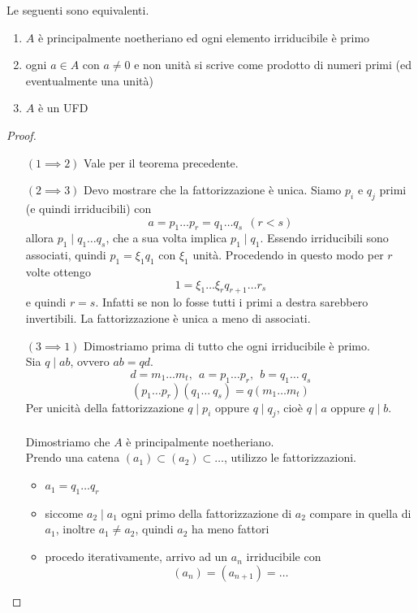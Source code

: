 	\label{lezione4}
\begin{teorema}
	Le seguenti sono equivalenti.
	\begin{enumerate}
		\item $A$ è principalmente noetheriano ed ogni elemento irriducibile è primo
		\item ogni $a \in A$ con $a\neq0$ e non unità si scrive come prodotto di numeri primi (ed eventualmente una unità)
		\item $A$ è un UFD
	\end{enumerate}
\end{teorema}
\begin{proof}\
	\begin{itemize}
		\item[$(1 \implies 2)$] Vale per il teorema precedente.
		\item[$(2 \implies 3)$] Devo mostrare che la fattorizzazione è unica. Siamo $p_i$ e $q_j$ primi (e quindi irriducibili) con
			\begin{equation*}
			a=p_1 \dots p_r = q_1 \dots q_s \ \ (r<s)
			\end{equation*}
			allora $p_1\mid q_1 \dots q_s$, che a sua volta implica $p_1\mid q_1$. Essendo irriducibili sono associati, quindi $p_1=\xi_1 q_1$ con $\xi_1$ unità. Procedendo in questo modo per $r$ volte ottengo
			\begin{equation*}
			1=\xi_1\dots\xi_r q_{r+1}\dots r_s
			\end{equation*}
			e quindi $r=s$. Infatti se non lo fosse tutti i primi a destra sarebbero invertibili. La fattorizzazione è unica a meno di associati.
		\item[$(3 \implies 1)$] Dimostriamo prima di tutto che ogni irriducibile è primo. \\ Sia $q\mid ab$, ovvero $ab=qd$.
			\begin{equation*}
			d=m_1\dots m_t, \ \ a=p_1\dots p_r, \ \ b=q_1\dots \ q_s
			\end{equation*}
			\begin{equation*}
			(p_1\dots p_r)(q_1\dots \ q_s)=q (m_1\dots m_t)
			\end{equation*}
			Per unicità della fattorizzazione $q\mid p_i$ oppure $q\mid q_j$, cioè $q\mid a$ oppure $q\mid b$. \\ \\
			Dimostriamo che $A$ è principalmente noetheriano. \\ Prendo una catena $(a_1)\subset(a_2)\subset\dots$, utilizzo le fattorizzazioni.
			\begin{itemize}
				\item $a_1=q_1\dots q_r$
				\item siccome $a_2 \mid a_1$ ogni primo della fattorizzazione di $a_2$ compare in quella di $a_1$, inoltre $a_1 \neq a_2$, quindi $a_2$ ha meno fattori
				\item procedo iterativamente, arrivo ad un $a_n$ irriducibile con 
				\begin{equation*}
				(a_n)=(a_{n+1})=\dots
				\end{equation*}
			\end{itemize}
	\end{itemize}
\end{proof}
